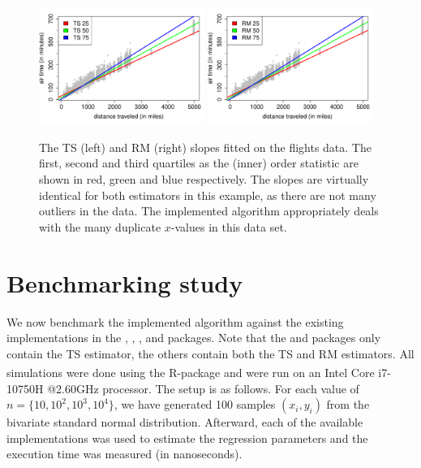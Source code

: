 \begin{figure}[!ht]%
\centering
\includegraphics[width=0.48\textwidth]{flights_example_TS}
\includegraphics[width=0.48\textwidth]{flights_example_RM}%
\caption{The TS (left) and RM (right) slopes fitted on the flights data. The first, second and third quartiles as the (inner) order statistic are shown in red, green and blue respectively. The slopes are virtually identical for both estimators in this example, as there are not many outliers in the data. The implemented algorithm appropriately deals with the many duplicate $x$-values in this data set.}%
\label{fig:flights}%
\end{figure}

\section{Benchmarking study}\label{sec:bench}

We now benchmark the implemented algorithm against the existing implementations in the , , , and  packages. Note that the  and  packages only contain the TS estimator, the others contain both the TS and RM estimators. All simulations were done using the R-package  \citep{microbenchmark} and were run  on an Intel\textsuperscript{\textregistered} Core\textsuperscript{\texttrademark} i7-10750H @2.60GHz processor. The setup is as follows. For each value of $n = \{10, 10^2, 10^3, 10^4\}$, we have generated 100 samples $(x_i,y_i)$ from the bivariate standard normal distribution. Afterward, each of the available implementations was used to estimate the regression parameters and the execution time was measured (in nanoseconds).\par

